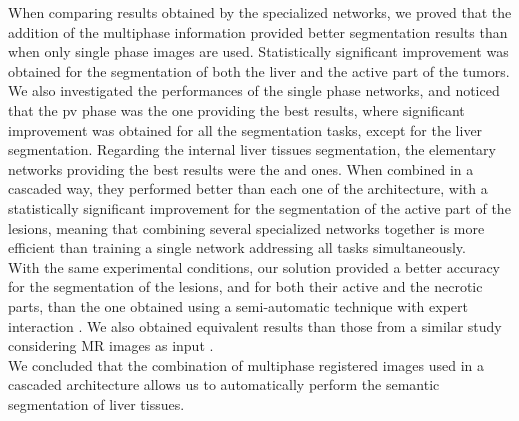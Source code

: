 When comparing results obtained by the specialized networks, we proved
that the addition of the multiphase information provided better
segmentation results than when only single phase images are used.
Statistically significant improvement was obtained for the segmentation
of both the liver and the active part of the tumors.
We also investigated the performances of the single phase networks, and
noticed that the \ac{pv} phase was the one providing the best results,
where significant improvement was obtained for all the segmentation
tasks, except for the liver segmentation.
Regarding the internal liver tissues segmentation, the elementary
networks providing the best results were the  
and  ones. When combined in a cascaded way, 
they performed better than each one of the  architecture, 
with a statistically significant improvement
for the segmentation of the active part of the lesions, meaning that 
combining several specialized networks together is more efficient 
than training a single network addressing all tasks simultaneously.\\
With the same experimental conditions, our solution provided a better
accuracy for the segmentation of the lesions, and for both their active
and the necrotic parts, than the one obtained using a semi-automatic
technique with expert interaction \cite{Ouhmich2019,Conze2017}. We also
obtained equivalent results than those from a similar study considering
MR images as input \cite{Zhang2018}.\\
We concluded that the combination of multiphase registered images used in a 
cascaded architecture allows us to automatically perform the semantic segmentation of liver tissues.

